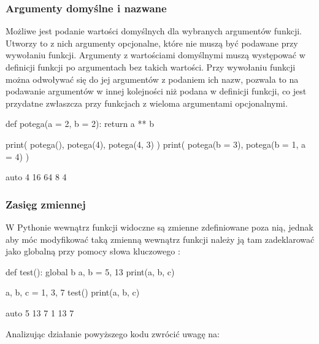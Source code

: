\vspace{-13pt}

\subsubsection{Argumenty domyślne i nazwane {\Symbola 🤔}}

Możliwe jest podanie wartości domyślnych dla wybranych argumentów funkcji. Utworzy to z nich argumenty opcjonalne, które nie muszą być podawane przy wywołaniu funkcji.
Argumenty z wartościami domyślnymi muszą występować w definicji funkcji po argumentach bez takich wartości.
Przy wywołaniu funkcji można odwoływać się do jej argumentów z podaniem ich nazw, pozwala to na podawanie argumentów w innej kolejności niż podana w definicji funkcji,
co jest przydatne zwłaszcza przy funkcjach z wieloma argumentami opcjonalnymi.

\begin{CodeFrame}[python]{.65\textwidth}
def potega(a = 2, b = 2):
    return a ** b

print( potega(), potega(4), potega(4, 3) )
print( potega(b = 3), potega(b = 1, a = 4) )
\end{CodeFrame}
\begin{CodeFrame}{auto}
4 16 64
8 4
\end{CodeFrame}

\subsubsection{Zasięg zmiennej {\Symbola 🤔}}

W Pythonie wewnątrz funkcji widoczne są zmienne zdefiniowane poza nią, jednak aby móc modyfikować taką zmienną wewnątrz
funkcji należy ją tam zadeklarować jako globalną przy pomocy słowa kluczowego :

\begin{CodeFrame}[python]{.5\textwidth}
def test():
  global b
  a, b = 5, 13
  print(a, b, c)

a, b, c = 1, 3, 7
test()
print(a, b, c)
\end{CodeFrame}
\begin{CodeFrame}{auto}
5 13 7
1 13 7
\end{CodeFrame}

\noindent
Analizując działanie powyższego kodu zwrócić uwagę na:

